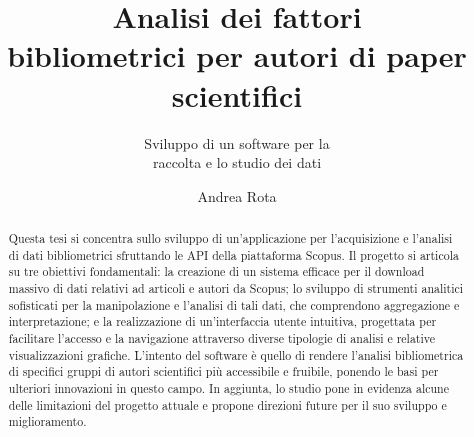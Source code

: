 \documentclass[italian,bachelor]{unibg}
\title{Analisi dei fattori \\bibliometrici per autori di paper scientifici}
\subtitle{Sviluppo di un software per la \\raccolta e lo studio dei dati}
\author{Andrea Rota}
\begin{document}


\maketitle
\emptypage

\begin{abstract}
Questa tesi si concentra sullo sviluppo di un'applicazione per l'acquisizione e l'analisi di dati bibliometrici sfruttando le API della piattaforma Scopus. Il progetto si articola su tre obiettivi fondamentali: la creazione di un sistema efficace per il download massivo di dati relativi ad articoli e autori da Scopus; lo sviluppo di strumenti analitici sofisticati per la manipolazione e l'analisi di tali dati, che comprendono aggregazione e interpretazione; e la realizzazione di un'interfaccia utente intuitiva, progettata per facilitare l'accesso e la navigazione attraverso diverse tipologie di analisi e relative visualizzazioni grafiche. L'intento del software è quello di rendere l'analisi bibliometrica di specifici gruppi di autori scientifici più accessibile e fruibile, ponendo le basi per ulteriori innovazioni in questo campo. In aggiunta, lo studio pone in evidenza alcune delle limitazioni del progetto attuale e propone direzioni future per il suo sviluppo e miglioramento.
\end{abstract}

\emptypage
{}
\emptypage

\clearpage
{}








\nocite{*}
\printbibliography[heading=bibintoc]
\end{document}

